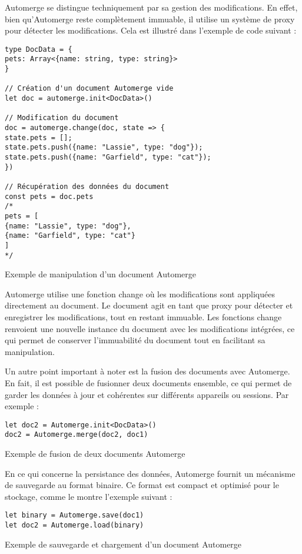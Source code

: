 Automerge se distingue techniquement par sa gestion des modifications. En effet, bien qu'Automerge reste complètement immuable, il utilise un système de proxy pour détecter les modifications. Cela est illustré dans l'exemple de code suivant :

\begin{listing}[H]
    \begin{verbatim}
type DocData = {
pets: Array<{name: string, type: string}>
}

// Création d'un document Automerge vide
let doc = automerge.init<DocData>()

// Modification du document
doc = automerge.change(doc, state => {
state.pets = [];
state.pets.push({name: "Lassie", type: "dog"});
state.pets.push({name: "Garfield", type: "cat"});
})

// Récupération des données du document
const pets = doc.pets
/*
pets = [
{name: "Lassie", type: "dog"},
{name: "Garfield", type: "cat"}
]
*/
\end{verbatim}
    \caption{Exemple de manipulation d'un document Automerge}
\end{listing}

Automerge utilise une fonction change où les modifications sont appliquées directement au document. Le document agit en tant que proxy pour détecter et enregistrer les modifications, tout en restant immuable. Les fonctions change renvoient une nouvelle instance du document avec les modifications intégrées, ce qui permet de conserver l'immuabilité du document tout en facilitant sa manipulation.

Un autre point important à noter est la fusion des documents avec Automerge. En fait, il est possible de fusionner deux documents ensemble, ce qui permet de garder les données à jour et cohérentes sur différents appareils ou sessions. Par exemple :

\begin{listing}[H]
    \begin{verbatim}
let doc2 = Automerge.init<DocData>()
doc2 = Automerge.merge(doc2, doc1)
  \end{verbatim}
    \caption{Exemple de fusion de deux documents Automerge}
\end{listing}

En ce qui concerne la persistance des données, Automerge fournit un mécanisme de sauvegarde au format binaire\cite{BinaryDocumentFormat}. Ce format est compact et optimisé pour le stockage, comme le montre l'exemple suivant :
\begin{listing}[H]
    \begin{verbatim}
let binary = Automerge.save(doc1)
let doc2 = Automerge.load(binary)
  \end{verbatim}
    \caption{Exemple de sauvegarde et chargement d'un document Automerge}
\end{listing}

